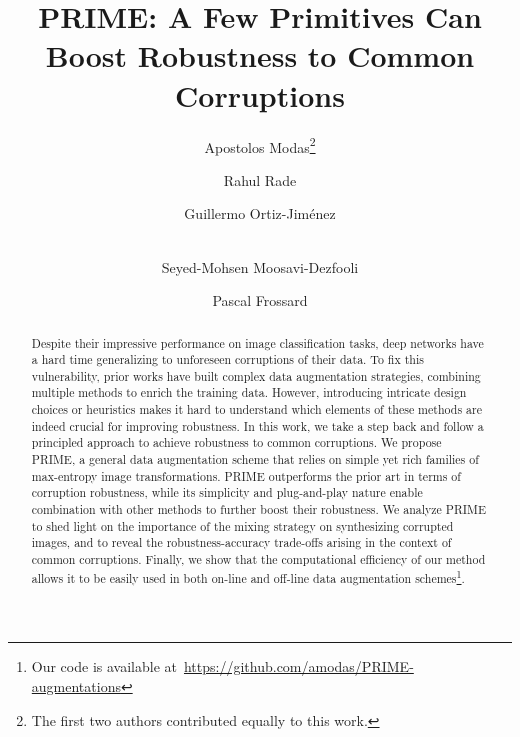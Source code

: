 \documentclass[runningheads]{llncs}
\begin{document}
\pagestyle{headings}
\mainmatter
\def\ECCVSubNumber{7539}  

\title{PRIME: A Few Primitives Can Boost Robustness to Common Corruptions} 

\begin{comment}
\titlerunning{ECCV-22 submission ID \ECCVSubNumber} 
\authorrunning{ECCV-22 submission ID \ECCVSubNumber} 
\author{Anonymous ECCV submission}
\institute{Paper ID \ECCVSubNumber}
\end{comment}






\author{Apostolos Modas\thanks{The first two authors contributed equally to this work.} \and
Rahul Rade\protect\footnotemark[1] \and
Guillermo Ortiz-Jim{\'e}nez \and \\
Seyed-Mohsen Moosavi-Dezfooli \and
Pascal Frossard
}


\maketitle
\setcounter{footnote}{0}

\begin{abstract}
Despite their impressive performance on image classification tasks, deep networks have a hard time generalizing to unforeseen corruptions of their data. To fix this vulnerability, prior works have built complex data augmentation strategies, combining multiple methods to enrich the training data. However, introducing intricate design choices or heuristics makes it hard to understand which elements of these methods are indeed crucial for improving robustness. In this work, we take a step back and follow a principled approach to achieve robustness to common corruptions. We propose PRIME, a general data augmentation scheme that relies on simple yet rich families of max-entropy image transformations. PRIME outperforms the prior art in terms of corruption robustness, while its simplicity and plug-and-play nature enable combination with other methods to further boost their robustness. We analyze PRIME to shed light on the importance of the mixing strategy on synthesizing corrupted images, and to reveal the robustness-accuracy trade-offs arising in the context of common corruptions. Finally, we show that the computational efficiency of our method allows it to be easily used in both on-line and off-line data augmentation schemes\footnote{Our code is available at~{\footnotesize\url{https://github.com/amodas/PRIME-augmentations}}}.
\end{abstract}
\end{document}
